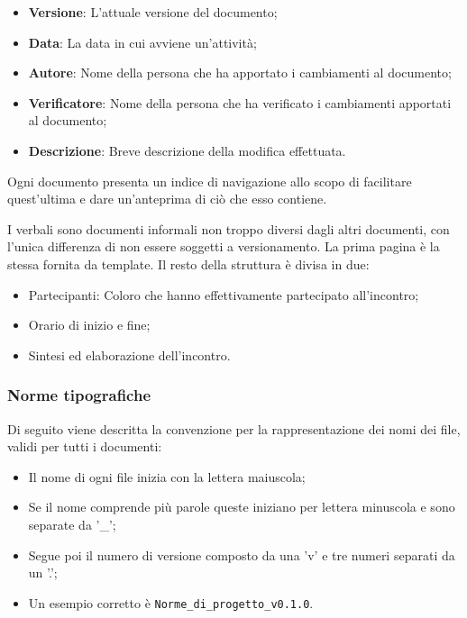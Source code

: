 \begin{itemize}
\item \textbf{Versione}: L'attuale versione del documento;
\item \textbf{Data}: La data in cui avviene un'attività;
\item \textbf{Autore}: Nome della persona che ha apportato i cambiamenti al documento;
\item \textbf{Verificatore}: Nome della persona che ha verificato i cambiamenti apportati al documento;
\item \textbf{Descrizione}: Breve descrizione della modifica effettuata.
\end{itemize}

        Ogni documento presenta un indice di navigazione allo scopo di facilitare quest'ultima e
        dare un'anteprima di ciò che esso contiene.


        I verbali sono documenti informali non troppo diversi dagli altri documenti, con l'unica differenza
        di non essere soggetti a versionamento.
        La prima pagina è la stessa fornita da template.
        Il resto della struttura è divisa in due:

\begin{itemize}
\item Partecipanti: Coloro che hanno effettivamente partecipato all'incontro;
\item Orario di inizio e fine;
\item Sintesi ed elaborazione dell'incontro.
\end{itemize}

\subsubsection{Norme tipografiche}

    Di seguito viene descritta la convenzione per la rappresentazione dei nomi dei file, validi per tutti i documenti:

\begin{itemize}
\item Il nome di ogni file inizia con la lettera maiuscola;
\item Se il nome comprende più parole queste iniziano per lettera minuscola e sono separate da '\_';
\item Segue poi il numero di versione composto da una 'v' e tre numeri separati da un '.';
\item Un esempio corretto è \texttt{Norme\_di\_progetto\_v0.1.0}.
\end{itemize}

